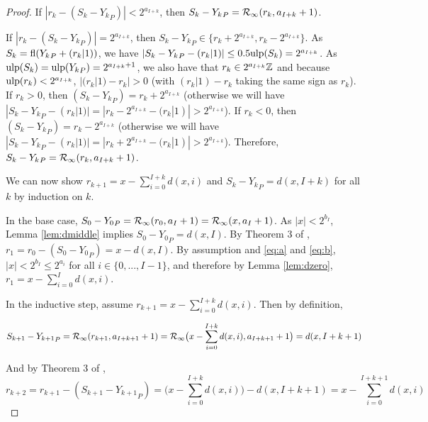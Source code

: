 \begin{proof}
        If $|r_k - (S_k - {Y_k}_P)| < 2^{a_{I + k}}$, then $S_k - {Y_k}_P = \mathcal{R}_\text{$\infty$}(r_k, a_{I + k} + 1)$.

        If $|r_k - (S_k - {Y_k}_P)| = 2^{a_{I + k}}$, then $S_k - {Y_k}_P \in \{r_k + 2^{a_{I + k}},  r_k - 2^{a_{I + k}}\}$.
        As $S_k = \text{fl}({Y_k}_P + (r_k|1))$, we have $|S_k - {Y_k}_P - (r_k|1)| \leq 0.5\text{ulp}(S_k) = 2^{a_{I + k}}$.  As $\text{ulp}(S_k) = \text{ulp}({Y_k}_P) = 2^{a_{I + k} + 1}$, we also have that $r_k \in 2^{a_{I + k}}\mathbb{Z}$  and because $\text{ulp}(r_k) < 2^{a_{I + k}}$, $|(r_k|1) - r_k| > 0$ (with $(r_k|1) - r_k$ taking the same sign as $r_k$).
        If $r_k > 0$, then $(S_k - {Y_k}_P) = r_k + 2^{a_{I + k}}$ (otherwise we will have $|S_k - {Y_k}_P - (r_k|1)| = |r_k - 2^{a_{I + k}} - (r_k|1)| > 2^{a_{I + k}}$).
        If $r_k < 0$, then $(S_k - {Y_k}_P) = r_k - 2^{a_{I + k}}$ (otherwise we will have $|S_k - {Y_k}_P - (r_k|1)| = |r_k + 2^{a_{I + k}} - (r_k|1)| > 2^{a_{I + k}}$). Therefore, $S_k - {Y_k}_P = \mathcal{R}_\text{$\infty$}(r_k, a_{I + k} + 1)$.

        We can now show $r_{k + 1} = x - \sum\limits_{i = 0}^{I + k}d(x, i)$ and $S_k - {Y_k}_P = d(x, I + k)$ for all $k$ by induction on $k$.

        In the base case, $S_0 - {Y_0}_P = \mathcal{R}_\text{$\infty$}(r_0, a_I + 1) = \mathcal{R}_\text{$\infty$}(x, a_I + 1)$. As $|x| < 2^{b_I}$, Lemma \ref{lem:dmiddle} implies $S_0 - {Y_0}_P = d(x, I)$. By Theorem 3 of \cite{repsum}, $r_1 = r_0 - (S_0 - {Y_0}_P) = x - d(x,I)$. By assumption and  \eqref{eq:a} and \eqref{eq:b}, $|x| < 2^{b_I} \leq 2^{a_{i}}$ for all $i \in \{0, ..., I - 1\}$, and therefore by Lemma \ref{lem:dzero}, $r_1 = x - \sum\limits_{i = 0}^Id(x, i)$.

        In the inductive step, assume $r_{k + 1} = x - \sum\limits_{i = 0}^{I + k}d(x, i)$. Then by definition,

        \begin{equation*}
          S_{k + 1} - {Y_{k + 1}}_P = \mathcal{R}_\text{$\infty$}(r_{k + 1}, a_{I + k + 1} + 1) = \mathcal{R}_\text{$\infty$}\bigl(x - \sum\limits_{i = 0}^{I + k}d(x, i), a_{I + k + 1} + 1\bigr) = d(x, I + k + 1)
        \end{equation*}

        And by Theorem 3 of \cite{repsum},
        \begin{equation*}
          r_{k + 2} = r_{k + 1} - (S_{k + 1} - {Y_{k + 1}}_P) = \bigl(x - \sum\limits_{i = 0}^{I + k}d(x, i)\bigr) - d(x, I + k + 1) = x - \sum\limits_{i = 0}^{I + k + 1}d(x, i)
        \end{equation*}
      \end{proof}

